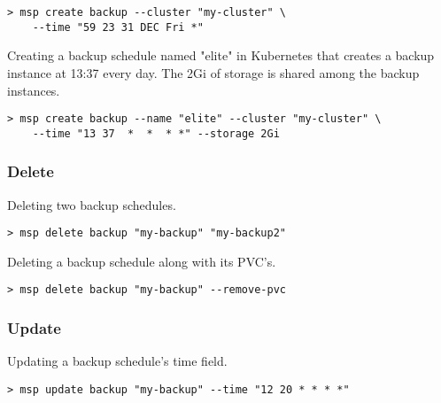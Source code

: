 \begin{lstlisting}
> msp create backup --cluster "my-cluster" \
	--time "59 23 31 DEC Fri *"
\end{lstlisting}

\noindent Creating a backup schedule named "elite" in Kubernetes that creates
a backup instance at 13:37 every day. The 2Gi of storage is shared among
the backup instances.

\begin{lstlisting}
> msp create backup --name "elite" --cluster "my-cluster" \
	--time "13 37  *  *  * *" --storage 2Gi
\end{lstlisting}

\subsubsection*{Delete}
\noindent Deleting two backup schedules.

\begin{lstlisting}
> msp delete backup "my-backup" "my-backup2"
\end{lstlisting}

\noindent Deleting a backup schedule along with its PVC's.

\begin{lstlisting}
> msp delete backup "my-backup" --remove-pvc
\end{lstlisting}

\subsubsection*{Update}
\noindent Updating a backup schedule's time field.

\begin{lstlisting}
> msp update backup "my-backup" --time "12 20 * * * *"
\end{lstlisting}

